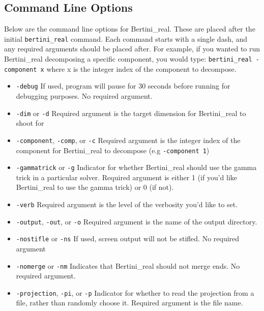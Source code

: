 \documentclass[10pt]{article}
\begin{document}
\subsection{Command Line Options}
Below are the command line options for Bertini\_real. These are placed after the initial \texttt{bertini\_real} command. Each command starts with a single dash, and any required arguments should be placed after. For example, if you wanted to run Bertini\_real decomposing a specific component, you would type: \texttt{bertini\_real -component x} where x is the integer index of the component to decompose.
\begin {itemize}
\item \texttt{-debug} \newline If used, program will pause for 30 seconds before running for debugging purposes. No required argument.
\item \texttt{-dim} or \texttt{-d} \newline Required argument is the target dimension for Bertini\_real to shoot for
\item \texttt{-component}, \texttt{-comp}, or \texttt{-c} \newline Required argument is the integer index of the component for Bertini\_real to decompose (e.g \texttt{-component 1})
\item \texttt{-gammatrick} or \texttt{-g} \newline Indicator for whether Bertini\_real should use the gamma trick in a particular solver. Required argument is either 1 (if you'd like Bertini\_real to use the gamma trick) or 0 (if not).
\item \texttt{-verb} \newline Required argument is the level of the verbosity you'd like to set.
\item \texttt{-output}, \texttt{-out}, or \texttt{-o} \newline Required argument is the name of the output directory.
\item \texttt{-nostifle} or \texttt{-ns} \newline If used, screen output will not be stifled. No required argument
\item \texttt{-nomerge} or \texttt{-nm} \newline Indicates that Bertini\_real should not merge ends. No required argument.
\item \texttt{-projection}, \texttt{-pi}, or \texttt{-p} \newline Indicator for whether to read the projection from a file, rather than randomly choose it. Required argument is the file name. 

\end{itemize}
\end{document}
